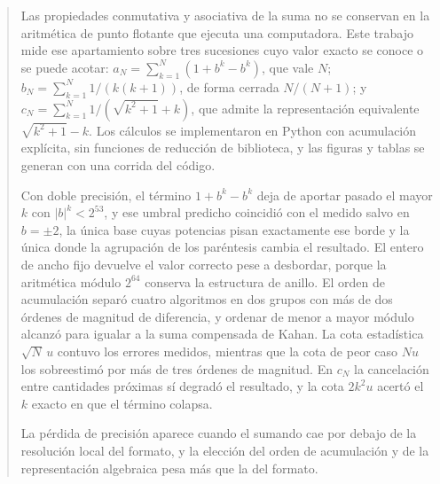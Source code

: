 \begin{abstract}

Las propiedades conmutativa y asociativa de la suma no se conservan en la aritmética de punto
flotante que ejecuta una computadora. Este trabajo mide ese apartamiento sobre tres sucesiones cuyo
valor exacto se conoce o se puede acotar: $a_N = \sum_{k=1}^{N} (1 + b^{k} - b^{k})$, que vale $N$;
$b_N = \sum_{k=1}^{N} 1/(k(k+1))$, de forma cerrada $N/(N+1)$; y
$c_N = \sum_{k=1}^{N} 1/(\sqrt{k^{2}+1} + k)$, que admite la representación equivalente
$\sqrt{k^{2}+1} - k$. Los cálculos se implementaron en Python con acumulación explícita, sin
funciones de reducción de biblioteca, y las figuras y tablas se generan con una corrida del código.

Con doble precisión, el término $1 + b^{k} - b^{k}$ deja de aportar pasado el mayor $k$ con
$|b|^{k} < 2^{53}$, y ese umbral predicho coincidió con el medido salvo en $b = \pm 2$, la única
base cuyas potencias pisan exactamente ese borde y la única donde la agrupación de los paréntesis
cambia el resultado. El entero de ancho fijo
devuelve el valor correcto pese a desbordar, porque la aritmética módulo $2^{64}$ conserva la
estructura de anillo. El orden de acumulación separó cuatro algoritmos en dos grupos con más de dos
órdenes de magnitud de diferencia, y ordenar de menor a mayor módulo alcanzó para igualar a la suma
compensada de Kahan. La cota estadística $\sqrt{N}\,u$ contuvo los errores medidos, mientras que la
cota de peor caso $Nu$ los sobreestimó por más de tres órdenes de magnitud. En $c_N$ la cancelación
entre cantidades próximas sí degradó el resultado, y la cota $2k^{2}u$ acertó el $k$ exacto en que
el término colapsa.

La pérdida de precisión aparece cuando el sumando cae por debajo de la resolución local del formato,
y la elección del orden de acumulación y de la representación algebraica pesa más que la del
formato.
\end{abstract}
